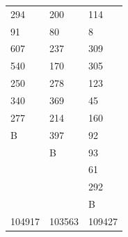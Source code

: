\documentclass[bwprint]{gmcmthesis}
\begin{document}
\begin{table}[htp!]
\begin{minipage}[h]{0.48\linewidth}
\begin{tabularx}{0.9\textwidth}{|Y|Y|Y|}
  294    & 200     & 114   \\
   91     & 80     & 8   \\
   607    & 237     & 309   \\
   540    & 170    & 305  \\
   250    & 278    & 123  \\
   340    & 369     & 45   \\
   277    & 214    & 160  \\
  B      & 397   & 92 \\
        &  B     &  93      \\
         &         &  61      \\
        &         &   292     \\
        &         &   B     \\
 104917  &  103563  &109427 \\
\hline
\end{tabularx}
\end{minipage}
\end{table}
\end{document}
